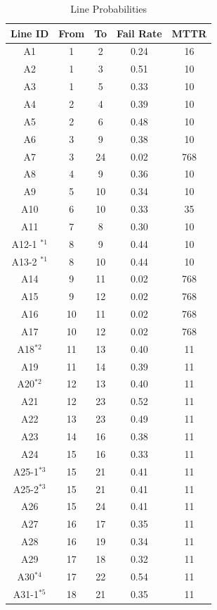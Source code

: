\documentclass[a4paper,oneside,12pt]{report}
\newcommand{\superscript}[1]{\tiny \ensuremath{^{\textrm{#1}}}}
\begin{document}
\begin{table}[htbp]
\caption{Line Probabilities}
\label{table_line}
\centering
\begin{tabular}{c||c||c||c||c}
\bfseries Line ID & \bfseries From & \bfseries To & \bfseries Fail Rate & \bfseries MTTR \\
\hline \hline
A1 & 1 & 2 & 0.24 & 16 \\
A2 & 1 & 3 & 0.51 & 10 \\
A3 & 1 & 5 & 0.33 & 10 \\
A4 & 2 & 4 & 0.39 & 10 \\
A5 & 2 & 6 & 0.48 & 10 \\
A6 & 3 & 9 & 0.38 & 10 \\
A7 & 3 & 24 & 0.02 & 768 \\
A8 & 4 & 9 & 0.36 & 10 \\
A9 & 5 & 10 & 0.34 & 10 \\
A10 & 6 & 10 & 0.33 & 35 \\
A11 & 7 & 8 & 0.30 & 10 \\
A12-1 \superscript{*1} & 8 & 9 & 0.44 & 10 \\
A13-2 \superscript{*1} & 8 & 10 & 0.44 & 10 \\
A14 & 9 & 11 & 0.02 & 768 \\
A15 & 9 & 12 & 0.02 & 768 \\
A16 & 10 & 11 & 0.02 & 768 \\
A17 & 10 & 12 & 0.02 & 768 \\
A18\superscript{*2} & 11 & 13 & 0.40 & 11 \\
A19 & 11 & 14 & 0.39 & 11 \\
A20\superscript{*2} & 12 & 13 & 0.40 & 11 \\
A21 & 12 & 23 & 0.52 & 11 \\
A22 & 13 & 23 & 0.49 & 11 \\
A23 & 14 & 16 & 0.38 & 11 \\
A24 & 15 & 16 & 0.33 & 11 \\
A25-1\superscript{*3} & 15 & 21 & 0.41 & 11 \\
A25-2\superscript{*3} & 15 & 21 & 0.41 & 11 \\
A26 & 15 & 24 & 0.41 & 11 \\
A27 & 16 & 17 & 0.35 & 11 \\
A28 & 16 & 19 & 0.34 & 11 \\
A29 & 17 & 18 & 0.32 & 11 \\
A30\superscript{*4} & 17 & 22 & 0.54 & 11 \\
A31-1\superscript{*5} & 18 & 21 & 0.35 & 11 \\

\end{tabular}
\end{table}
\end{document}
